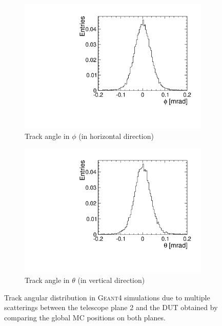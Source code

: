 \begin{figure}[htbp] \centering
  \begin{subfigure}[b]{0.45\textwidth}
    \includegraphics[width=\textwidth]{./figures/Telescope/MC_trackAnglePhi_planes_302_50.pdf}
    \caption{Track angle in $\phi$ (in horizontal direction)}
  \end{subfigure}\hfill
  \begin{subfigure}[b]{0.45\textwidth}
    \includegraphics[width=\textwidth]{./figures/Telescope/MC_trackAngleTheta_planes_302_50.pdf}
    \caption{Track angle in $\theta$ (in vertical direction)}
  \end{subfigure}
  \caption{Track angular distribution in \textsc{Geant4} simulations
    due to multiple scatterings between the telescope plane 2 and the
    DUT obtained by comparing the global MC positions on both planes.}
  \label{fig:MCbeamAngleDistr}
\end{figure}

